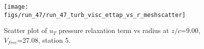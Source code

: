 \begin{figure}[H]
\centering
\texttt{[image: figs/run\_47/run\_47\_turb\_visc\_ettap\_vs\_r\_meshscatter]}
\caption{Scatter plot of $
u_T$ pressure relaxation term vs radius at $z/c$=9.00, $V_{free}$=27.08, station 5.}
\end{figure}


